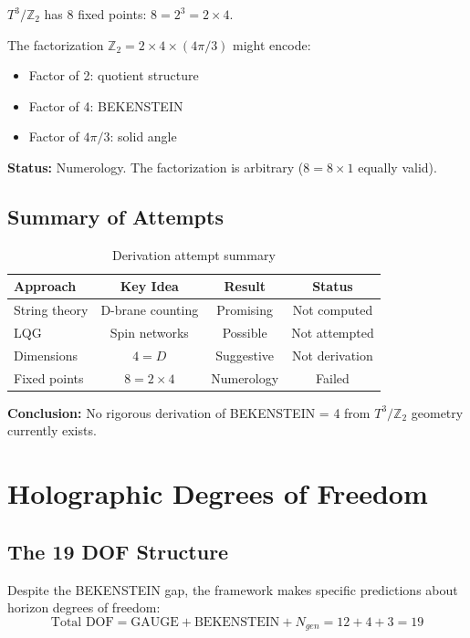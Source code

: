\documentclass[12pt,a4paper]{article}
\begin{document}
$T^3/\mathbb{Z}_2$ has 8 fixed points: $8 = 2^3 = 2 \times 4$.

The factorization $\mathbb{Z}_2 = 2 \times 4 \times (4\pi/3)$ might encode:
\begin{itemize}
    \item Factor of 2: quotient structure
    \item Factor of 4: BEKENSTEIN
    \item Factor of $4\pi/3$: solid angle
\end{itemize}

\textbf{Status:} Numerology. The factorization is arbitrary ($8 = 8 \times 1$ equally valid).

\subsection{Summary of Attempts}

\begin{table}[h]
\centering
\begin{tabular}{lccc}
\toprule
Approach & Key Idea & Result & Status \\
\midrule
String theory & D-brane counting & Promising & Not computed \\
LQG & Spin networks & Possible & Not attempted \\
Dimensions & $4 = D$ & Suggestive & Not derivation \\
Fixed points & $8 = 2 \times 4$ & Numerology & Failed \\
\bottomrule
\end{tabular}
\caption{Derivation attempt summary}
\end{table}

\textbf{Conclusion:} No rigorous derivation of BEKENSTEIN = 4 from $T^3/\mathbb{Z}_2$ geometry currently exists.

\section{Holographic Degrees of Freedom}

\subsection{The 19 DOF Structure}

Despite the BEKENSTEIN gap, the framework makes specific predictions about horizon degrees of freedom:
\begin{equation}
\text{Total DOF} = \text{GAUGE} + \text{BEKENSTEIN} + N_{gen} = 12 + 4 + 3 = 19
\end{equation}
\end{document}
